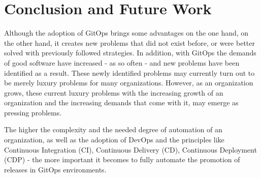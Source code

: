 \chapter{Conclusion and Future Work}

Although the adoption of GitOps brings some advantages on the one hand,
on the other hand, it creates new problems
that did not exist before,
or were better solved with previously followed strategies.
In addition, with GitOps the demands of good software have increased
- as so often -
and new problems have been identified as a result.
These newly identified problems may currently turn out 
to be merely
luxury problems for many organizations.
However, as an organization grows, these current luxury problems
with the increasing growth of an organization
and the increasing demands that come with it,
may emerge as pressing problems.
\bigskip

\noindent
The higher the complexity and the needed degree of automation
of an organization,
as well as the adoption of DevOps
and the principles like
Continuous Integration (CI),
Continuous Delivery (CD),
Continuous Deployment (CDP) -
the more important it becomes to fully automate the promotion of releases in GitOps environments.








